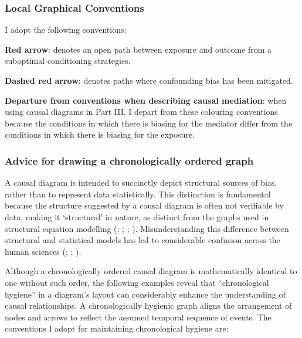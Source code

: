 \documentclass[
  singlecolumn,
  9pt]{article}
\begin{document}
\subsubsection{Local Graphical
Conventions}\label{local-graphical-conventions}

I adopt the following conventions:

\textbf{Red arrow}: denotes an open path between exposure and outcome
from a suboptimal conditioning strategies.

\textbf{Dashed red arrow}: denotes paths where confounding bias has been
mitigated.

\textbf{Departure from conventions when describing causal mediation}:
when using causal diagrams in Part III, I depart from these colouring
conventions because the conditions in which there is biasing for the
mediator differ from the conditions in which there is biasing for the
exposure.

\subsubsection{Advice for drawing a chronologically ordered
graph}\label{advice-for-drawing-a-chronologically-ordered-graph}

A causal diagram is intended to succinctly depict structural sources of
bias, rather than to represent data statistically. This distinction is
fundamental because the structure suggested by a causal diagram is often
not verifiable by data, making it `structural' in nature, as distinct
from the graphs used in structural equation modelling
(;
;
;
). Misunderstanding this
difference between structural and statistical models has led to
considerable confusion across the human sciences
(;
;
).

Although a chronologically ordered causal diagram is mathematically
identical to one without such order, the following examples reveal that
``chronological hygiene'' in a diagram's layout can considerably enhance
the understanding of causal relationships. A chronologically hygienic
graph aligns the arrangement of nodes and arrows to reflect the assumed
temporal sequence of events. The conventions I adopt for maintaining
chronological hygiene are:
\end{document}
